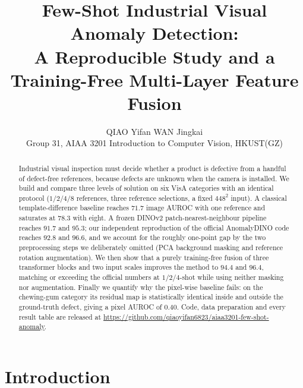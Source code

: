\documentclass[10pt,twocolumn,letterpaper]{article}
\begin{document}
\title{Few-Shot Industrial Visual Anomaly Detection:\\ A Reproducible Study and a Training-Free Multi-Layer Feature Fusion}

\author{QIAO Yifan \qquad WAN Jingkai\\
Group 31, AIAA 3201 Introduction to Computer Vision, HKUST(GZ)}

\maketitle

\begin{abstract}
Industrial visual inspection must decide whether a product is defective from a
handful of defect-free references, because defects are unknown when the camera
is installed. We build and compare three levels of solution on six VisA
categories with an identical protocol ($1/2/4/8$ references, three reference
selections, a fixed $448^2$ input). A classical template-difference baseline
reaches $71.7$ image AUROC with one reference and saturates at $78.3$ with
eight. A frozen DINOv2 patch-nearest-neighbour pipeline reaches $91.7$ and
$95.3$; our independent reproduction of the official AnomalyDINO code reaches
$92.8$ and $96.6$, and we account for the roughly one-point gap by the two
preprocessing steps we deliberately omitted (PCA background masking and
reference rotation augmentation). We then show that a purely training-free
fusion of three transformer blocks and two input scales improves the method to
$94.4$ and $96.4$, matching or exceeding the official numbers at
$1/2/4$-shot while using neither masking nor augmentation. Finally we quantify
why the pixel-wise baseline fails: on the chewing-gum category its residual map
is statistically identical inside and outside the ground-truth defect, giving a
pixel AUROC of $0.40$. Code, data preparation and every result table are
released at \url{https://github.com/qiaoyifan6823/aiaa3201-few-shot-anomaly}.
\end{abstract}

\section{Introduction}
\end{document}
